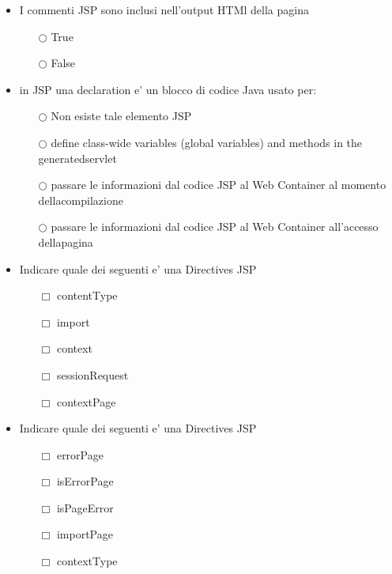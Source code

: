 \documentclass[10pt,twocolumn]{article}
\begin{document}
\begin{itemize}
    \item I commenti JSP sono inclusi nell'output HTMl della pagina
          \begin{itemize}
              \item[$\bigcirc$] True
              \item[$\bigcirc$] False
          \end{itemize}
\end{itemize}
\begin{itemize}
    \item in JSP una declaration e’ un blocco di codice Java usato per:
          \begin{itemize}
              \item[$\bigcirc$] Non esiste tale elemento JSP
              \item[$\bigcirc$] define class-wide variables (global variables) and methods in the generatedservlet
              \item[$\bigcirc$] passare le informazioni dal codice JSP al Web Container al momento dellacompilazione
              \item[$\bigcirc$] passare le informazioni dal codice JSP al Web Container all'accesso dellapagina
          \end{itemize}
\end{itemize}
\begin{itemize}
    \item Indicare quale dei seguenti e' una Directives JSP
          \begin{itemize}
              \item[$\Box$] contentType
              \item[$\Box$] import
              \item[$\Box$] context
              \item[$\Box$] sessionRequest
              \item[$\Box$] contextPage
          \end{itemize}
\end{itemize}
\begin{itemize}
    \item Indicare quale dei seguenti e' una Directives JSP
          \begin{itemize}
              \item[$\Box$] errorPage
              \item[$\Box$] isErrorPage
              \item[$\Box$] isPageError
              \item[$\Box$] importPage
              \item[$\Box$] contextType
          \end{itemize}
\end{itemize}
\end{document}
